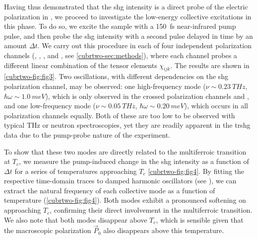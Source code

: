 Having thus demonstrated that the \gls{shg} intensity is a direct probe of the electric polarization in , we proceed to investigate the low-energy collective excitations in this phase.
To do so, we excite the sample with a \qty{150}{fs} near-infrared pump pulse, and then probe the \gls{shg} intensity with a second pulse delayed in time by an amount $\Delta t$.
We carry out this procedure in each of four independent polarization channels (\PP, \PS, \SP, and \SS, see \cref{cubrtwo-sec:methods}), where each channel probes a different linear combination of the tensor elements $\chi_{ijk}$.
The results are shown in \cref{cubrtwo-fig:fig3}.
Two oscillations, with different dependencies on the \gls{shg} polarization channel, may be observed: one high-frequency mode ($\nu \sim \qty{0.23}{THz}$, $\hbar \omega \sim \qty{1.0}{meV}$), which is only observed in the crossed polarization channels \PS and \SP, and one low-frequency mode ($\nu \sim \qty{0.05}{THz}$, $\hbar \omega \sim \qty{0.20}{meV}$), which occurs in all polarization channels equally.
Both of these are too low to be observed with typical \si{THz} or neutron spectroscopies, yet they are readily apparent in the \gls{trshg} data due to the pump-probe nature of the experiment.

To show that these two modes are directly related to the multiferroic transition at $T_c$, we measure the pump-induced change in the \gls{shg} intensity as a function of $\Delta t$ for a series of temperatures approaching $T_c$ \cref{cubrtwo-fig:fig4}.
By fitting the respective time-domain traces to damped harmonic oscillators (see ), we can extract the natural frequency of each collective mode as a function of temperature (\cref{cubrtwo-fig:fig4}).
Both modes exhibit a pronounced softening on approaching $T_c$, confirming their direct involvement in the multiferroic transition.
We also note that both modes disappear above $T_c$, which is sensible given that the macroscopic polarization $\vec{P}_{0}$ also disappears above this temperature.

